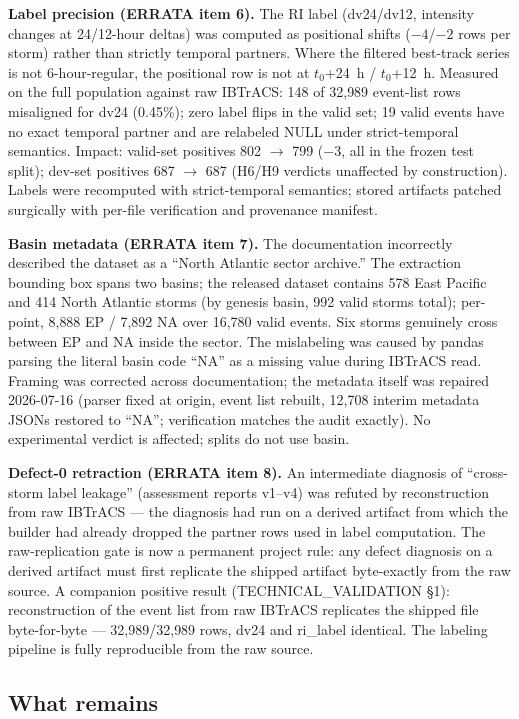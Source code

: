 \documentclass[11pt]{article}
\begin{document}
\textbf{Label precision (ERRATA item 6).} The RI label (dv24/dv12, intensity
changes at 24/12-hour deltas) was computed as positional shifts ($-4$/$-2$ rows
per storm) rather than strictly temporal partners. Where the filtered
best-track series is not 6-hour-regular, the positional row is not at
$t_0$+24~h / $t_0$+12~h. Measured on the full population against raw IBTrACS:
148 of 32{,}989 event-list rows misaligned for dv24 (0.45\%); zero label flips
in the valid set; 19 valid events have no exact temporal partner and are
relabeled NULL under strict-temporal semantics. Impact: valid-set positives 802
$\to$ 799 ($-3$, all in the frozen test split); dev-set positives 687 $\to$ 687
(H6/H9 verdicts unaffected by construction). Labels were recomputed with
strict-temporal semantics; stored artifacts patched surgically with per-file
verification and provenance manifest.

\textbf{Basin metadata (ERRATA item 7).} The documentation incorrectly
described the dataset as a ``North Atlantic sector archive.'' The extraction
bounding box spans two basins; the released dataset contains 578 East Pacific
and 414 North Atlantic storms (by genesis basin, 992 valid storms total);
per-point, 8{,}888 EP / 7{,}892 NA over 16{,}780 valid events. Six storms
genuinely cross between EP and NA inside the sector. The mislabeling was caused
by pandas parsing the literal basin code ``NA'' as a missing value during
IBTrACS read. Framing was corrected across documentation; the metadata itself
was repaired 2026-07-16 (parser fixed at origin, event list rebuilt, 12{,}708
interim metadata JSONs restored to ``NA''; verification matches the audit
exactly). No experimental verdict is affected; splits do not use basin.

\textbf{Defect-0 retraction (ERRATA item 8).} An intermediate diagnosis of
``cross-storm label leakage'' (assessment reports v1--v4) was refuted by
reconstruction from raw IBTrACS --- the diagnosis had run on a derived artifact
from which the builder had already dropped the partner rows used in label
computation. The raw-replication gate is now a permanent project rule: any
defect diagnosis on a derived artifact must first replicate the shipped
artifact byte-exactly from the raw source. A companion positive result
(TECHNICAL\_VALIDATION \S1): reconstruction of the event list from raw IBTrACS
replicates the shipped file byte-for-byte --- 32{,}989/32{,}989 rows, dv24 and
ri\_label identical. The labeling pipeline is fully reproducible from the raw
source.

\subsection{What remains}
\end{document}
